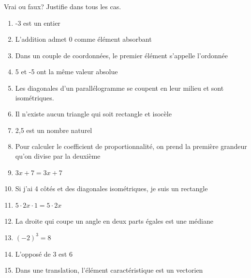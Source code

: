 %
%
	Vrai ou faux? Justifie dans tous les cas.
	\begin{enumerate}
		\item -3 est un entier
		\item L'addition admet 0 comme élément absorbant
		\item Dans un couple de coordonnées, le premier élément s'appelle l'ordonnée
		\item 5 et -5 ont la même valeur absolue
		\item Les diagonales d'un parallélogramme se coupent en leur milieu et sont isométriques.
		\item Il n'existe aucun triangle qui soit rectangle et isocèle
		\item 2,5 est un nombre naturel
		\item Pour calculer le coefficient de proportionnalité, on prend la première grandeur qu'on divise par la deuxième
		\item \(3x + 7 = 3x + 7\)
		\item Si j'ai 4 côtés et des diagonales isométriques, je suis un rectangle
		\item \(5 \cdot 2x \cdot 1 = 5 \cdot 2x\)
		\item La droite qui coupe un angle en deux parts égales est une médiane
		\item \((-2)^3=8\)
		\item L'opposé de 3 est 6
		\item Dans une translation, l'élément caractéristique est un vectorien
	\end{enumerate}
